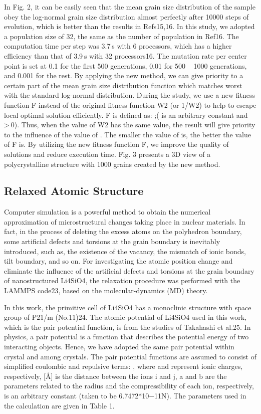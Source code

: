 \documentclass{article}
\begin{document}
In Fig. 2, it can be easily seen that the mean grain size distribution of the sample obey the log-normal grain size distribution almost perfectly after 10000 steps of evolution, which is better than the results in Refs15,16. In this study, we adopted a population size of 32, the same as the number of population in Ref16. The computation time per step was 3.7 s with 6 processors, which has a higher efficiency than that of 3.9 s with 32 processors16. The mutation rate per center point is set at 0.1 for the first 500 generations, 0.01 for 500 ~ 1000 generations, and 0.001 for the rest. By applying the new method, we can give priority to a certain part of the mean grain size distribution function which matches worst with the standard log-normal distribution. During the study, we use a new fitness function F instead of the original fitness function W2 (or 1/W2) to help to escape local optimal solution efficiently. F is defined as:  ;( is an arbitrary constant and  > 0). Thus, when the value of W2 has the same value, the result will give priority to the influence of the value of . The smaller the value of  is, the better the value of F is. By utilizing the new fitness function F, we improve the quality of solutions and reduce execution time. Fig. 3 presents a 3D view of a polycrystalline structure with 1000 grains created by the new method.

\subsection{Relaxed Atomic Structure}

Computer simulation is a powerful method to obtain the numerical approximation of microstructural changes taking place in nuclear materials. In fact, in the process of deleting the excess atoms on the polyhedron boundary, some artificial defects and torsions at the grain boundary is inevitably introduced, such as, the existence of the vacancy, the mismatch of ionic bonds, tilt boundary, and so on. For investigating the atomic position change and eliminate the influence of the artificial defects and torsions at the grain boundary of nanostructured Li4SiO4, the relaxation procedure was performed with the LAMMPS code23, based on the molecular-dynamics (MD) theory.

In this work, the primitive cell of Li4SiO4 has a monoclinic structure with space group of P21/m (No.11)24. The atomic potential of Li4SiO4 used in this work, which is the pair potential function, is from the studies of Takahashi et al.25. In physics, a pair potential is a function that describes the potential energy of two interacting objects. Hence, we have adopted the same pair potential within crystal and among crystals. The pair potential functions are assumed to consist of simplified coulombic and repulsive terms: , where  and represent ionic charges, respectively, [Å] is the distance between the ions i and j, a and b are the parameters related to the radius and the compressibility of each ion, respectively,  is an arbitrary constant (taken to be 6.7472*10−11N). The parameters used in the calculation are given in Table 1.
\end{document}
